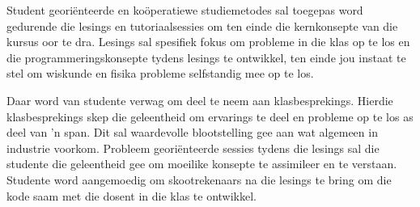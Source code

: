     Student geori\"{e}nteerde en ko\"{o}peratiewe studiemetodes sal
    toegepas word gedurende die lesings en tutoriaalsessies om ten
    einde die kernkonsepte van die kursus oor te dra.  Lesings sal
    spesifiek fokus om probleme in die klas op te los en die
    programmeringskonsepte tydens lesings te ontwikkel, ten einde jou
    instaat te stel om wiskunde en fisika probleme selfstandig mee op
    te los.

    Daar word van studente verwag om deel te neem aan
    klasbesprekings. Hierdie klasbesprekings skep die geleentheid om
    ervarings te deel en probleme op te los as deel van 'n span.  Dit
    sal waardevolle blootstelling gee aan wat algemeen in industrie
    voorkom. Probleem geori\"{e}nteerde sessies tydens die lesings sal
    die studente die geleentheid gee om moeilike konsepte te
    assimileer en te verstaan. Studente word aangemoedig om
    skootrekenaars na die lesings te bring om die kode saam met die
    dosent in die klas te ontwikkel.




    
